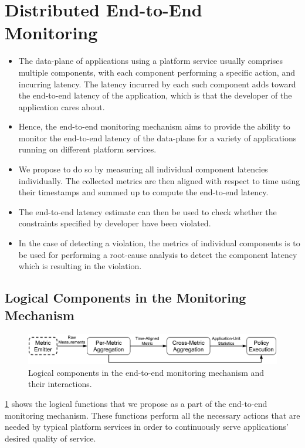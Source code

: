 \section{Distributed End-to-End Monitoring}
\begin{itemize}
\item The data-plane of applications using a platform service usually comprises multiple components, with each component performing a specific action, and incurring latency. The latency incurred by each such component adds toward the end-to-end latency of the application, which is that the developer of the application cares about.
\item Hence, the end-to-end monitoring mechanism aims to provide the ability to monitor the end-to-end latency of the data-plane for a variety of applications running on different platform services.
\item We propose to do so by measuring all individual component latencies individually. The collected metrics are then aligned with respect to time using their timestamps and summed up to compute the end-to-end latency.
\item The end-to-end latency estimate can then be used to check whether the constraints specified by developer have been violated. 
\item In the case of detecting a violation, the metrics of individual components is to be used for performing a root-cause analysis to detect the component latency which is resulting in the violation.
\end{itemize}

\subsection{Logical Components in the Monitoring Mechanism}
\label{sec:monitoring_logical}
\begin{figure}
\centering
\includegraphics[width=\linewidth]{figures/design_space/monitoring/functions.pdf}
\caption{Logical components in the end-to-end monitoring mechanism and their interactions.}
\label{fig:monitoring_functions}
\end{figure}
\cref{fig:monitoring_functions} shows the logical functions that we propose as a part of the end-to-end monitoring mechanism. These functions perform all the necessary actions that are needed by typical platform services in order to continuously serve applications' desired quality of service.

